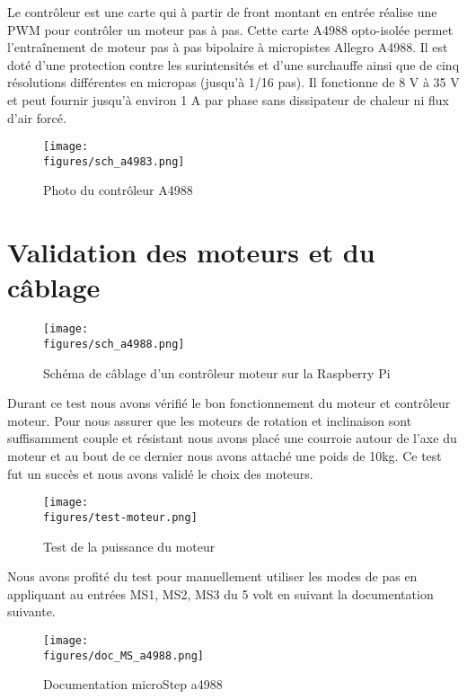 Le contrôleur est une carte qui à partir de front montant en entrée réalise une PWM pour contrôler un moteur pas à pas.
Cette carte A4988 opto-isolée permet l’entraînement de moteur pas à pas bipolaire à micropistes Allegro A4988. Il est doté d’une protection contre les surintensités et d’une surchauffe ainsi que de cinq résolutions différentes en micropas (jusqu’à 1/16 pas). Il fonctionne de 8 V à 35 V et peut fournir jusqu’à environ 1 A par phase sans dissipateur de chaleur ni flux d’air forcé.

\begin{figure}[H]
    \centering
    \texttt{[image: \\figures/sch\_a4983.png]}
    \decoRule
    \caption[
    Photo du contrôleur A4988]{
    Photo du contrôleur A4988}
    \label{fig:Photo du contrôleur A4988}
    \end{figure}

\section{Validation des moteurs et du câblage}
\begin{figure}[H]
    \centering
    \texttt{[image: \\figures/sch\_a4988.png]}
    \decoRule
    \caption[
    Schéma de câblage d'un contrôleur moteur sur la Raspberry Pi]{
    Schéma de câblage d'un contrôleur moteur sur la Raspberry Pi}
    \label{fig:Schéma de câblage d'un contrôleur moteur sur la Raspberry Pi}
    \end{figure}

Durant ce test nous avons vérifié le bon fonctionnement du moteur et contrôleur moteur. \newline
Pour nous assurer que les moteurs de rotation et inclinaison sont suffisamment couple et résistant nous avons placé une courroie autour de l'axe du moteur et au bout de ce dernier nous avons attaché une poids de 10kg.
Ce test fut un succès et nous avons validé le choix des moteurs.

\begin{figure}[H]
    \centering
    \texttt{[image: \\figures/test-moteur.png]}
    \decoRule
    \caption[
    Test de la puissance du moteur]{
    Test de la puissance du moteur}
    \label{fig:Test de la puissance du moteur}
    \end{figure}

Nous avons profité du test pour manuellement utiliser les modes de pas en appliquant au entrées MS1, MS2, MS3 du 5 volt en suivant la documentation suivante.

\begin{figure}[H]
    \centering
    \texttt{[image: \\figures/doc\_MS\_a4988.png]}
    \decoRule
    \caption[
    Documentation microStep a4988]{
    Documentation microStep a4988}
    \label{fig:Documentation microStep a4988}
    \end{figure}

\vspace{1cm}








